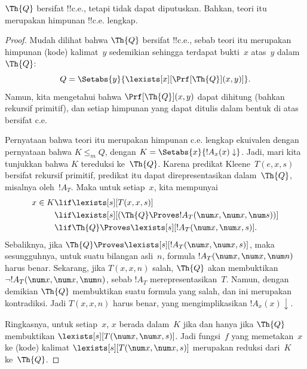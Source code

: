\documentclass[../../../include/open-logic-section]{subfiles}
\begin{document}



\begin{thm}
$\Th{Q}$ bersifat !!{c.e.}, tetapi tidak dapat diputuskan. Bahkan,
teori itu merupakan himpunan !!{c.e.} lengkap.
\end{thm}

\begin{proof}
Mudah dilihat bahwa $\Th{Q}$ bersifat !!{c.e.}, sebab teori itu merupakan
himpunan (kode) kalimat~$y$ sedemikian sehingga terdapat bukti~$x$ atas~$y$
dalam~$\Th{Q}$:
\[
Q = \Setabs{y}{\lexists[x][\Prf[\Th{Q}](x,y)]}.
\]
Namun, kita mengetahui bahwa $\Prf[\Th{Q}](x,y)$ dapat dihitung (bahkan
rekursif primitif), dan setiap himpunan yang dapat ditulis dalam bentuk di
atas bersifat c.e.

Pernyataan bahwa teori itu merupakan himpunan c.e. lengkap ekuivalen dengan
pernyataan bahwa $K \leq_m Q$, dengan $K = \Setabs{x}{!A_x(x) \downarrow}$.
Jadi, mari kita tunjukkan bahwa $K$ tereduksi ke~$\Th{Q}$. Karena predikat
Kleene~$T(e,x,s)$ bersifat rekursif primitif, predikat itu dapat
direpresentasikan dalam~$\Th{Q}$, misalnya oleh~$!A_T$. Maka untuk setiap~$x$,
kita mempunyai
\begin{align*}
x \in K & \lif \lexists[s][T(x,x,s)] \\
& \lif \lexists[s][(\Th{Q} \Proves !A_T(\num x,\num x, \num s))]
  \\
& \lif \Th{Q} \Proves \lexists[s][!A_T(\num x, \num x, s)].
\end{align*}
Sebaliknya, jika $\Th{Q} \Proves \lexists[s][!A_T(\num x, \num x, s)]$,
maka sesungguhnya, untuk suatu bilangan asli~$n$, formula $!A_T(\num x,
\num x, \num n)$ harus benar. Sekarang, jika $T(x,x,n)$ salah, $\Th{Q}$
akan membuktikan $\lnot !A_T(\num x, \num x, \num n)$, sebab $!A_T$
merepresentasikan~$T$. Namun, dengan demikian $\Th{Q}$ membuktikan suatu
formula yang salah, dan ini merupakan kontradiksi. Jadi $T(x,x,n)$ harus
benar, yang mengimplikasikan $!A_x(x) \downarrow$.

Ringkasnya, untuk setiap~$x$, $x$ berada dalam~$K$ jika dan hanya jika
$\Th{Q}$ membuktikan $\lexists[s][T(\num x,\num x,s)]$. Jadi fungsi~$f$
yang memetakan~$x$ ke (kode) kalimat $\lexists[s][T(\num x,
  \num x, s)]$ merupakan reduksi dari~$K$ ke~$\Th{Q}$.
\end{proof}
\end{document}
